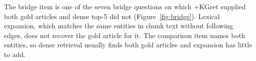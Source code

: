 \documentclass[preprint,12pt]{elsarticle}
\begin{document}
The bridge item is one of the seven bridge questions on which +KGret supplied
both gold articles and dense top-5 did not (Figure~\ref{fig:bridge}). Lexical
expansion, which matches the same entities in chunk text without following
edges, does not recover the gold article for it. The comparison item names
both entities, so dense retrieval usually finds both gold articles and
expansion has little to add.
\end{document}
